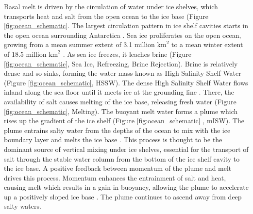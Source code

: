 Basal melt is driven by the circulation of water under ice shelves, which transports heat and salt from the open ocean to the ice base (Figure {\ref{fig:ocean_schematic}}. The largest circulation pattern in ice shelf cavities starts in the open ocean surrounding Antarctica \citep{jacobs1992melting}. Sea ice proliferates on the open ocean, growing from a mean summer extent of 3.1 million $\mathrm{km}^2$ to a mean winter extent of 18.5 million $\mathrm{km}^2$  \citep{hobbs2016review}. As sea ice freezes, it leaches brine (Figure {\ref{fig:ocean_schematic}}, Sea Ice, Refreezing, Brine Rejection). Brine is relatively dense and so sinks, forming the water mass known as High Salinity Shelf Water (Figure {\ref{fig:ocean_schematic}}, HSSW). The dense High Salinity Shelf Water flows inland along the sea floor until it meets ice at the grounding line \citep{jacobs1992melting}. There, the availability of salt causes melting of the ice base, releasing fresh water (Figure {\ref{fig:ocean_schematic}}, Melting). The buoyant melt water forms a plume which rises up the gradient of the ice shelf (Figure {\ref{fig:ocean_schematic}
}, mISW). The plume entrains salty water from the depths of the ocean to mix with the ice boundary layer and melts the ice base \citep{jacobs1992melting}. 
This process is thought to be the dominant source of vertical mixing under ice shelves, essential for the transport of salt through the stable water column from the bottom of the ice shelf cavity to the ice base.  
A positive feedback between momentum of the plume and melt drives this process. Momentum enhances the entrainment of salt and heat, causing melt which results in a gain in buoyancy, allowing the plume to accelerate up a positively sloped ice base  \citep{jenkins1991one}.  The plume continues to ascend away from deep salty waters. 

